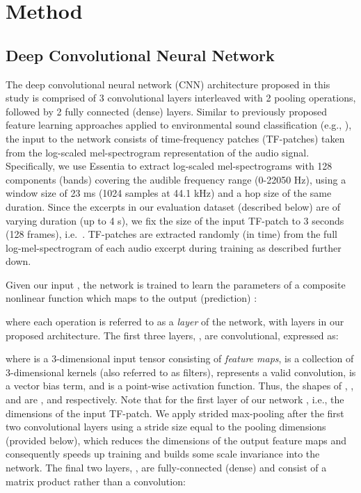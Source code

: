 \documentclass[journal,pdf]{IEEEtran}
\begin{document}
\section{Method}
\label{sec:method}

\subsection{Deep Convolutional Neural Network}

The deep convolutional neural network (CNN) architecture proposed in this study 
is comprised of 3 convolutional layers interleaved with 2 pooling operations, followed by 2 fully connected (dense) layers.
Similar to previously proposed feature learning approaches applied to environmental sound classification (e.g., \cite{Salamon:UnsupervisedUrban:ICASSP:15}), the input to the network consists of time-frequency patches (TF-patches) taken from the log-scaled mel-spectrogram representation of the audio signal. Specifically, we use Essentia \cite{bogdanov:Essentia:ISMIR13} to extract log-scaled mel-spectrograms with 128 components (bands) covering the audible frequency range (0-22050 Hz), using a window size of 23 ms (1024 samples at 44.1 kHz) and a hop size of the same duration. Since the excerpts in our evaluation dataset (described below) are of varying duration (up to 4 s), we fix the size of the input TF-patch  to 3 seconds (128 frames), i.e.~. TF-patches are extracted randomly (in time) from the full log-mel-spectrogram of each audio excerpt during training as described further down.

Given our input , the network is trained to learn the parameters  of a composite nonlinear function  which maps  to the output (prediction) :

where each operation  is referred to as a \emph{layer} of the network, with  layers in our proposed architecture. The first three layers, , are convolutional, expressed as:

where  is a 3-dimensional input tensor consisting of  \emph{feature maps},  is a collection of  3-dimensional kernels (also referred to as filters),  represents a valid convolution,  is a vector bias term, and  is a point-wise activation function. Thus, the shapes of , , and  are ,  and  respectively. Note that for the first layer of our network , i.e., the dimensions of the input TF-patch. 
We apply strided
max-pooling after the first two convolutional layers 
using a stride size equal to the pooling dimensions (provided below),
which reduces the dimensions of the output feature maps and consequently speeds up training and builds some scale invariance into the network. The final two layers, , are fully-connected (dense) and consist of a matrix product rather than a convolution:
\end{document}

